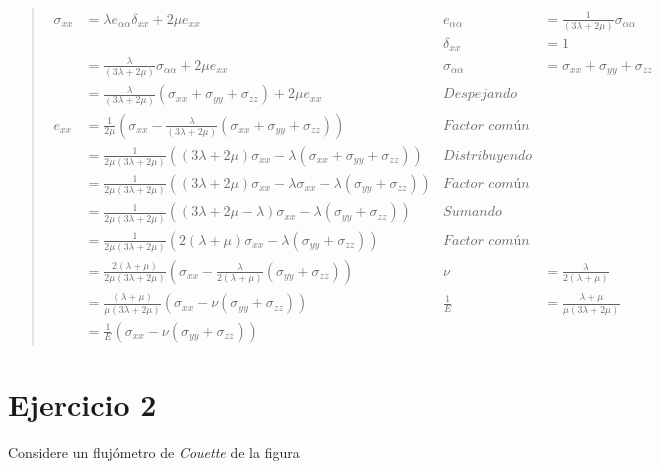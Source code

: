 \documentclass[a4paper,10pt,twoside,final,spanish]{article}
\begin{document}
\begin{quote}
\begin{tcolorbox}[colback=gray!10!white,colframe=black!0!white]
\begin{align*}
\sigma_{xx} &= \lambda e_{\alpha\alpha}\delta_{xx}+2\mu e_{xx} 
& e_{\alpha\alpha} &= \frac{1}{(3\lambda+2\mu)}\sigma_{\alpha\alpha} \\
&& \delta_{xx} &= 1 \\
&= \frac{\lambda}{(3\lambda+2\mu)}\sigma_{\alpha\alpha}+2\mu e_{xx}
& \sigma_{\alpha\alpha} &= \sigma_{xx}+\sigma_{yy}+\sigma_{zz} \\
&= \frac{\lambda}{(3\lambda+2\mu)}(\sigma_{xx}+\sigma_{yy}+\sigma_{zz})+2\mu e_{xx}
& \textit{Despejando} \\
e_{xx} &= \frac{1}{2\mu}\left(\sigma_{xx}-\frac{\lambda}{(3\lambda+2\mu)}(\sigma_{xx}+\sigma_{yy}+\sigma_{zz})\right)
& \textit{Factor común} \\
&= \frac{1}{2\mu(3\lambda+2\mu)}\left((3\lambda+2\mu)\sigma_{xx}-\lambda(\sigma_{xx}+\sigma_{yy}+\sigma_{zz})\right) 
& \textit{Distribuyendo} \\
&= \frac{1}{2\mu(3\lambda+2\mu)}\left((3\lambda+2\mu)\sigma_{xx}-\lambda\sigma_{xx}-\lambda(\sigma_{yy}+\sigma_{zz})\right) & \textit{Factor común}\\
&= \frac{1}{2\mu(3\lambda+2\mu)}\left((3\lambda+2\mu-\lambda)\sigma_{xx}-\lambda(\sigma_{yy}+\sigma_{zz})\right) & \textit{Sumando}\\
&= \frac{1}{2\mu(3\lambda+2\mu)}\left(2(\lambda+\mu)\sigma_{xx}-\lambda(\sigma_{yy}+\sigma_{zz})\right) & \textit{Factor común} \\
&= \frac{2(\lambda+\mu)}{2\mu(3\lambda+2\mu)}\left(\sigma_{xx}-\frac{\lambda}{2(\lambda+\mu)}(\sigma_{yy}+\sigma_{zz})\right)
& \nu &= \frac{\lambda}{2(\lambda+\mu)} \\
&= \frac{(\lambda+\mu)}{\mu(3\lambda+2\mu)}\left(\sigma_{xx}-\nu(\sigma_{yy}+\sigma_{zz})\right)
& \frac{1}{E} &= \frac{\lambda+\mu}{\mu(3\lambda+2\mu)} \\
&= \frac{1}{E}\left(\sigma_{xx}-\nu(\sigma_{yy}+\sigma_{zz})\right)
\end{align*}

\end{tcolorbox}

\end{quote}

\section*{Ejercicio 2}

Considere un flujómetro de \textit{Couette} de la figura
\end{document}
